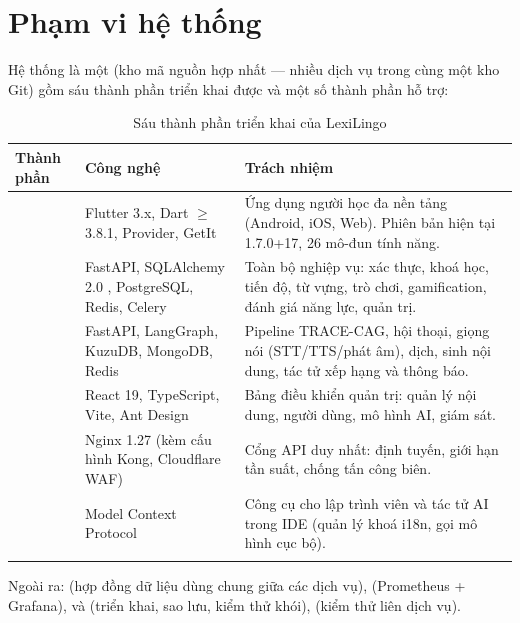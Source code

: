 \section{Phạm vi hệ thống}

Hệ thống là một  (kho mã nguồn hợp nhất — nhiều dịch vụ trong cùng một kho
Git) gồm sáu thành phần triển khai được và một số thành phần hỗ trợ:

\begin{longtable}{L{3.2cm} L{4.2cm} L{6.2cm}}
\toprule
\textbf{Thành phần} & \textbf{Công nghệ} & \textbf{Trách nhiệm}\\
\midrule
\endhead
{} & Flutter 3.x, Dart \(\ge\)3.8.1, Provider, GetIt &
Ứng dụng người học đa nền tảng (Android, iOS, Web). Phiên bản hiện tại 1.7.0+17, 26 mô-đun tính năng.\\
 & FastAPI, SQLAlchemy 2.0 , PostgreSQL, Redis, Celery &
Toàn bộ nghiệp vụ: xác thực, khoá học, tiến độ, từ vựng, trò chơi, gamification, đánh giá năng lực, quản trị.\\
 & FastAPI, LangGraph, KuzuDB, MongoDB, Redis &
Pipeline TRACE-CAG, hội thoại, giọng nói (STT/TTS/phát âm), dịch, sinh nội dung, tác tử xếp hạng và thông báo.\\
 & React 19, TypeScript, Vite, Ant Design &
Bảng điều khiển quản trị: quản lý nội dung, người dùng, mô hình AI, giám sát.\\
 & Nginx 1.27 (kèm cấu hình Kong, Cloudflare WAF) &
Cổng API duy nhất: định tuyến, giới hạn tần suất, chống tấn công biên.\\
 & Model Context Protocol &
Công cụ cho lập trình viên và tác tử AI trong IDE (quản lý khoá i18n, gọi mô hình cục bộ).\\
\bottomrule
\caption{Sáu thành phần triển khai của LexiLingo}
\end{longtable}

Ngoài ra:  (hợp đồng dữ liệu dùng chung giữa các dịch vụ),
 (Prometheus + Grafana),  và 
(triển khai, sao lưu, kiểm thử khói),  (kiểm thử liên dịch vụ).

